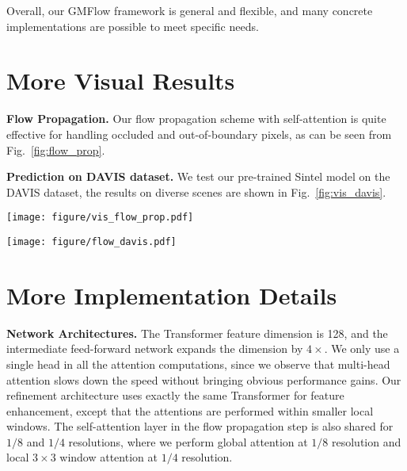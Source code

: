 \documentclass[10pt,twocolumn,letterpaper]{article}
\begin{document}
Overall, our GMFlow framework is general and flexible, and many concrete implementations are possible to meet specific needs.






\section{More Visual Results}

{\bf Flow Propagation.} Our flow propagation scheme with self-attention is quite effective for handling occluded and out-of-boundary pixels, as can be seen from Fig.~\ref{fig:flow_prop}.

{\bf Prediction on DAVIS dataset.} We test our pre-trained Sintel model on the DAVIS \cite{perazzi2016benchmark} dataset, the results on diverse scenes are shown in Fig.~\ref{fig:vis_davis}.







\begin{figure*}[t]
    \centering
    \texttt{[image: figure/vis\_flow\_prop.pdf]}
    \caption{Our \textbf{flow propagation} (prop.) scheme significantly improves the performance of occluded and out-of-boundary pixels.}
    \label{fig:flow_prop}
\end{figure*}






\begin{figure*}[t]
    \centering
    \texttt{[image: figure/flow\_davis.pdf]}
    \caption{\textbf{Visual results on DAVIS dataset}.}
    \label{fig:vis_davis}
\end{figure*}






\section{More Implementation Details}


{\bf Network Architectures.} The Transformer feature dimension is 128, and the intermediate feed-forward network expands the dimension by $4\times$. We only use a single head in all the attention computations, since we observe that multi-head attention slows down the speed without bringing obvious performance gains. Our refinement architecture uses exactly the same Transformer for feature enhancement, except that the attentions are performed within smaller local windows. The self-attention layer in the flow propagation step is also shared for $1/8$ and $1/4$ resolutions, where we perform global attention at $1/8$ resolution and local $3 \times 3$ window attention at $1/4$ resolution. 
\end{document}

